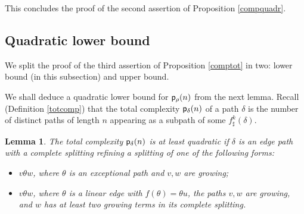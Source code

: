 \documentclass[11pt]{amsart}
\newtheorem{lem}[thm]{Lemma}
\theoremstyle{remark}
\newcommand{\cp}{{\sf  p}}
\begin{document}
This concludes the proof of  the second assertion of Proposition \ref{compquadr}.

 \subsection{Quadratic lower bound} \label{qlb}
 We split the proof of the third assertion of Proposition \ref{comptot} in two: lower bound (in this subsection) and upper bound. 

 We shall deduce a quadratic lower bound for $\cp_\rho(n)$ from
the next lemma. Recall (Definition \ref{totcomp})  that the total complexity $\cp_\delta(n)$ of a path $\delta$  
 is the number of distinct   paths of length $n$ appearing as a subpath of some $f^k_\sharp(\delta)$. 

 
\begin{lem} \label{entour}
The total complexity $\cp_\delta(n)$ is at least quadratic 
if $\delta$ is an edge path with a complete splitting refining a splitting of one of the following forms:
\begin{itemize}
\item  
  $v\theta w$, where $\theta$ is an exceptional path and $v,w$ are growing;
  \item $v\theta w$, where $\theta$ is a linear edge with $f(\theta)=\theta u$,   the paths  $v,w$ are growing, and $w$ has at least two growing terms in its complete splitting.
\end{itemize}
\end{lem}
\end{document}
